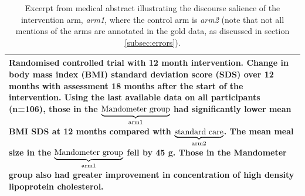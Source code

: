 \begin{table}[h]
\begin{adjustbox}{center}
\begin{tabular}{p{10.5cm}}
\hline
{\small Randomised controlled trial with 12 month intervention. Change in body mass index (BMI) standard deviation score (SDS) over 12 months with assessment 18 months after the start of the intervention. Using the last available data on all participants (n=106), those in the $\underbrace{\hbox{Mandometer group}}_{\text{arm1}}$ had significantly lower mean BMI SDS at 12 months compared with $\underbrace{\hbox{standard care}}_{\text{arm2}}$. The mean meal size in the $\underbrace{\hbox{Mandometer group}}_{\text{arm1}}$ fell by 45 g. Those in the Mandometer group also had greater improvement in concentration of high density lipoprotein cholesterol.}\\\hline
  \end{tabular}
  \end{adjustbox}
  \caption{Excerpt from medical abstract illustrating the discourse salience of the intervention arm, \textit{arm1}, where the control arm is \textit{arm2} (note that not all mentions of the arms are annotated in the gold data, as discussed in section \ref{subsec:errors}).}
  \label{tab:1}
\end{table}
